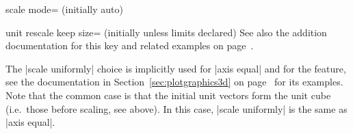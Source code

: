 \begin{pgfplotskey}{scale mode= (initially auto)}
\begin{pgfplotskey}{
		unit rescale keep size= (initially unless limits declared)}
		See also the addition documentation for this key and related examples on page~\pageref{key:unit:rescale:keep:size}.
	\end{pgfplotskey}

	The |scale uniformly| choice is implicitly used for |axis equal| and for the  feature, see the documentation in Section~\ref{sec:plotgraphics3d} on page~\pageref{sec:plotgraphics3d} for its examples. Note that the common case is that the initial unit vectors form the unit cube (i.e.\ those before scaling, see above). In this case, |scale uniformly| is the same as |axis equal|.
\end{pgfplotskey}

